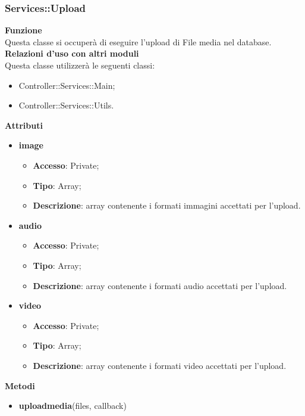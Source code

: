 {{		\subsubsection{Services::\-Upload}{
			\label{sub:servicesUpload}
			\textbf{Funzione}\\
			\indent Questa classe si occuperà di eseguire l'upload di File media nel database.\\
			\textbf{Relazioni d'uso con altri moduli}\\
			\indent Questa classe utilizzerà le seguenti classi:
			\begin{itemize}
				\item Controller::Services::\-Main;
				\item Controller::Services::\-Utils.
			\end{itemize}
			\textbf{Attributi}
			\begin{itemize}
				\item \textbf{image}
				\begin{itemize}
					\item \textbf{Accesso}: Private;
					\item \textbf{Tipo}: Array;
					\item \textbf{Descrizione}: array contenente i formati immagini accettati per l'upload.
				\end{itemize}
				\item \textbf{audio}
				\begin{itemize}
					\item \textbf{Accesso}: Private;
					\item \textbf{Tipo}: Array;
					\item \textbf{Descrizione}: array contenente i formati audio accettati per l'upload.
				\end{itemize}
				\item \textbf{video}
				\begin{itemize}
					\item \textbf{Accesso}: Private;
					\item \textbf{Tipo}: Array;
					\item \textbf{Descrizione}: array contenente i formati video accettati per l'upload.
				\end{itemize}
			\end{itemize}
			\textbf{Metodi}
			\begin{itemize}
				\item \textbf{uploadmedia}(files, callback)
				\begin{itemize}

\end{itemize}
\end{itemize}}}}
